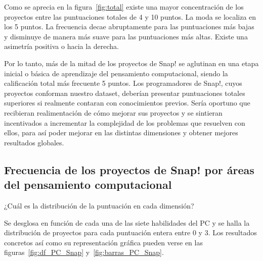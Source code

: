 \documentclass[a4paper, 12pt]{book}
\begin{document}
Como se aprecia en la figura~\ref{fig:total} existe una mayor concentración de los proyectos entre las puntuaciones totales de 4 y 10 puntos. La moda se localiza en los 5 puntos. La frecuencia decae abruptamente para las puntuaciones más bajas y disminuye de manera más suave para las puntuaciones más altas. Existe una asimetría positiva o hacia la derecha.

Por lo tanto, más de la mitad de los proyectos de Snap! se aglutinan en una etapa inicial o básica de aprendizaje del pensamiento computacional, siendo la calificación total más frecuente 5 puntos. Los programadores de Snap!, cuyos proyectos conforman nuestro dataset, deberían presentar puntuaciones totales superiores si realmente contaran con conocimientos previos. Sería oportuno que recibieran realimentación de cómo mejorar sus proyectos y se sintieran incentivados a incrementar la complejidad de los problemas que resuelven con ellos, para así poder mejorar en las distintas dimensiones y obtener mejores resultados globales. 

\subsection{Frecuencia de los proyectos de Snap! por áreas del pensamiento computacional}
\label{subsec:frec_pc_Snap}

¿Cuál es la distribución de la puntuación en cada dimensión?

Se desglosa en función de cada una de las siete habilidades del PC y se halla la distribución de proyectos para cada puntuación entera entre 0 y 3. Los resultados concretos así como su representación gráfica pueden verse en las figuras~\ref{fig:df_PC_Snap} y~\ref{fig:barras_PC_Snap}. 
\end{document}
